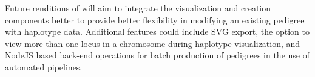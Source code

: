 Future renditions of \haplo will aim to integrate the visualization and creation components better to provide better flexibility in modifying an existing pedigree with haplotype data. Additional features could include SVG export, the option to view more than one locus in a chromosome during haplotype visualization, and NodeJS based back-end operations for batch production of pedigrees in the use of automated pipelines.

